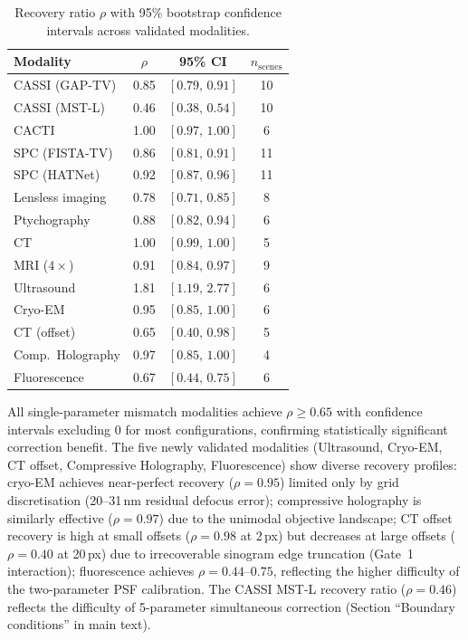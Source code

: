 \documentclass[11pt]{article}
\theoremstyle{definition}
\begin{document}
\begin{table}[!ht]
\centering\small
\caption{Recovery ratio $\rho$ with 95\% bootstrap confidence intervals across validated modalities.}
\label{tab:bootstrap_rho}
\begin{tabular}{@{}lccc@{}}
\toprule
Modality & $\rho$ & 95\% CI & $n_{\mathrm{scenes}}$ \\
\midrule
CASSI (GAP-TV)    & 0.85 & $[0.79,\, 0.91]$ & 10 \\
CASSI (MST-L)     & 0.46 & $[0.38,\, 0.54]$ & 10 \\
CACTI             & 1.00 & $[0.97,\, 1.00]$ & 6 \\
SPC (FISTA-TV)    & 0.86 & $[0.81,\, 0.91]$ & 11 \\
SPC (HATNet)      & 0.92 & $[0.87,\, 0.96]$ & 11 \\
Lensless imaging  & 0.78 & $[0.71,\, 0.85]$ & 8 \\
Ptychography      & 0.88 & $[0.82,\, 0.94]$ & 6 \\
CT                & 1.00 & $[0.99,\, 1.00]$ & 5 \\
MRI ($4\times$)   & 0.91 & $[0.84,\, 0.97]$ & 9 \\
Ultrasound        & 1.81 & $[1.19,\, 2.77]$ & 6 \\
Cryo-EM           & 0.95 & $[0.85,\, 1.00]$ & 6 \\
CT (offset)       & 0.65 & $[0.40,\, 0.98]$ & 5 \\
Comp.\ Holography & 0.97 & $[0.85,\, 1.00]$ & 4 \\
Fluorescence      & 0.67 & $[0.44,\, 0.75]$ & 6 \\
\bottomrule
\end{tabular}
\end{table}

\noindent All single-parameter mismatch modalities achieve $\rho \geq 0.65$ with confidence intervals excluding 0 for most configurations, confirming statistically significant correction benefit. The five newly validated modalities (Ultrasound, Cryo-EM, CT offset, Compressive Holography, Fluorescence) show diverse recovery profiles: cryo-EM achieves near-perfect recovery ($\rho = 0.95$) limited only by grid discretisation (20--31\,nm residual defocus error); compressive holography is similarly effective ($\rho = 0.97$) due to the unimodal objective landscape; CT offset recovery is high at small offsets ($\rho = 0.98$ at 2\,px) but decreases at large offsets ($\rho = 0.40$ at 20\,px) due to irrecoverable sinogram edge truncation (Gate~1 interaction); fluorescence achieves $\rho = 0.44$--$0.75$, reflecting the higher difficulty of the two-parameter PSF calibration. The CASSI MST-L recovery ratio ($\rho = 0.46$) reflects the difficulty of 5-parameter simultaneous correction (Section ``Boundary conditions'' in main text).
\end{document}
